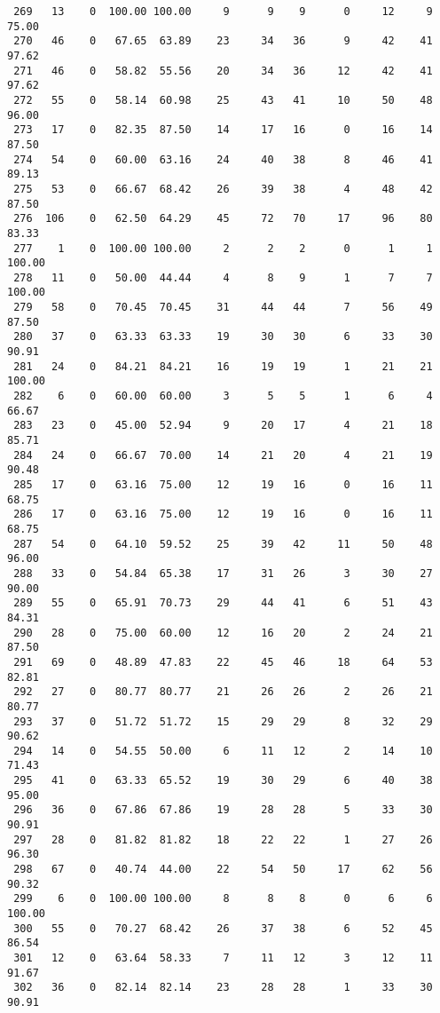 \begin{verbatim}
 269   13    0  100.00 100.00     9      9    9      0     12     9    75.00
 270   46    0   67.65  63.89    23     34   36      9     42    41    97.62
 271   46    0   58.82  55.56    20     34   36     12     42    41    97.62
 272   55    0   58.14  60.98    25     43   41     10     50    48    96.00
 273   17    0   82.35  87.50    14     17   16      0     16    14    87.50
 274   54    0   60.00  63.16    24     40   38      8     46    41    89.13
 275   53    0   66.67  68.42    26     39   38      4     48    42    87.50
 276  106    0   62.50  64.29    45     72   70     17     96    80    83.33
 277    1    0  100.00 100.00     2      2    2      0      1     1   100.00
 278   11    0   50.00  44.44     4      8    9      1      7     7   100.00
 279   58    0   70.45  70.45    31     44   44      7     56    49    87.50
 280   37    0   63.33  63.33    19     30   30      6     33    30    90.91
 281   24    0   84.21  84.21    16     19   19      1     21    21   100.00
 282    6    0   60.00  60.00     3      5    5      1      6     4    66.67
 283   23    0   45.00  52.94     9     20   17      4     21    18    85.71
 284   24    0   66.67  70.00    14     21   20      4     21    19    90.48
 285   17    0   63.16  75.00    12     19   16      0     16    11    68.75
 286   17    0   63.16  75.00    12     19   16      0     16    11    68.75
 287   54    0   64.10  59.52    25     39   42     11     50    48    96.00
 288   33    0   54.84  65.38    17     31   26      3     30    27    90.00
 289   55    0   65.91  70.73    29     44   41      6     51    43    84.31
 290   28    0   75.00  60.00    12     16   20      2     24    21    87.50
 291   69    0   48.89  47.83    22     45   46     18     64    53    82.81
 292   27    0   80.77  80.77    21     26   26      2     26    21    80.77
 293   37    0   51.72  51.72    15     29   29      8     32    29    90.62
 294   14    0   54.55  50.00     6     11   12      2     14    10    71.43
 295   41    0   63.33  65.52    19     30   29      6     40    38    95.00
 296   36    0   67.86  67.86    19     28   28      5     33    30    90.91
 297   28    0   81.82  81.82    18     22   22      1     27    26    96.30
 298   67    0   40.74  44.00    22     54   50     17     62    56    90.32
 299    6    0  100.00 100.00     8      8    8      0      6     6   100.00
 300   55    0   70.27  68.42    26     37   38      6     52    45    86.54
 301   12    0   63.64  58.33     7     11   12      3     12    11    91.67
 302   36    0   82.14  82.14    23     28   28      1     33    30    90.91

\end{verbatim}

